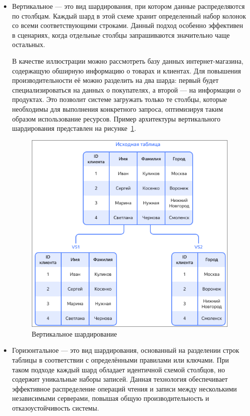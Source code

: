 \begin{itemize}
    \item Вертикальное — это вид шардирования, при котором
    данные распределяются по столбцам. Каждый шард в этой схеме хранит
    определенный набор колонок со всеми соответствующими строками. Данный
    подход особенно эффективен в сценариях, когда отдельные столбцы
    запрашиваются значительно чаще остальных.

    В качестве иллюстрации можно рассмотреть базу данных интернет-магазина,
    содержащую обширную информацию о товарах и клиентах. Для повышения
    производительности её можно разделить на два шарда: первый будет
    специализироваться на данных о покупателях, а второй — на информации о
    продуктах. Это позволит системе загружать только те столбцы, которые
    необходимы для выполнения конкретного запроса, оптимизируя таким образом
    использование ресурсов. Пример архитектуры вертикального шардирования
    представлен на рисунке~\ref{fig:fig01}.

\begin{figure}
  \centering
  \includegraphics[scale=0.35]{inc/vertical-sharding.png}
  \caption{Вертикальное шардирование}
  \label{fig:fig01}
\end{figure}
    \item Горизонтальное — это вид шардирования, основанный на разделении строк
    таблицы в соответствии с определёнными правилами или ключами. При таком
    подходе каждый шард обладает идентичной схемой столбцов, но содержит
    уникальные наборы записей. Данная технология обеспечивает эффективное
    распределение операций чтения и записи между несколькими независимыми
    серверами, повышая общую производительность и отказоустойчивость системы.


\end{itemize}
